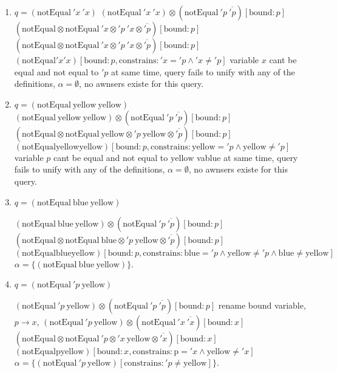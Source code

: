 \documentclass[11pt,a4paper]{report}
\newcommand{\var}[1]{'#1}
\newcommand{\unify}{\otimes}
\begin{document}
\begin{enumerate}
\item $q = (\text{notEqual}\ \var{x}\ \var{x})$
\subitem $(\text{notEqual}\ \var{x}\ \var{x}) \unify (\text{notEqual}\ \var{p}\ \overline{\var{p}})[\text{bound}: p]$
\subitem $(\text{notEqual} \unify \text{notEqual}\ \var{x} \unify \var{p}\ \var{x} \unify \overline{\var{p}})[\text{bound}: p]$ 
\subitem $(\text{notEqual} \unify \text{notEqual}\ \var{x} \unify \var{p}\ \var{x} \unify \overline{\var{p}})[\text{bound}: p]$ 
\subitem $(\text{notEqual} \var{x} \var{x})[\text{bound}: p, \text{constrains}: \var{x}=\var{p} \wedge \var{x} \neq \var{p}]$
\subitem variable $x$ cant be equal and not equal to $\var{p}$ at same time,
\subitem query fails to unify with any of the definitions,
\subitem $\alpha=\emptyset$, no awnsers existe for this query.

\item $q = (\text{notEqual}\  \text{yellow}\ \text{yellow})$
\subitem $(\text{notEqual}\ \text{yellow}\ \text{yellow}) \unify (\text{notEqual}\ \var{p}\ \overline{\var{p}})[\text{bound}: p]$
\subitem $(\text{notEqual} \unify \text{notEqual}\ \text{yellow} \unify \var{p}\ \text{yellow} \unify \overline{\var{p}})[\text{bound}: p]$ 
\subitem $(\text{notEqual} \text{yellow} \text{yellow})[\text{bound}: p, \text{constrains}: \text{yellow}=\var{p} \wedge \text{yellow} \neq \var{p}]$
\subitem variable $p$ cant be equal and not equal to $\text{yellow}$ vablue at same time,
\subitem query fails to unify with any of the definitions,
\subitem $\alpha=\emptyset$, no awnsers existe for this query.

\item $q = (\text{notEqual}\  \text{blue}\ \text{yellow})$

\subitem $(\text{notEqual}\ \text{blue}\ \text{yellow}) \unify (\text{notEqual}\ \var{p}\ \overline{\var{p}})[\text{bound}: p]$
\subitem $(\text{notEqual} \unify \text{notEqual}\ \text{blue} \unify \var{p}\ \text{yellow} \unify \overline{\var{p}})[\text{bound}: p]$ 
\subitem $(\text{notEqual} \text{blue} \text{yellow})[\text{bound}: p, \text{constrains}: \text{blue}=\var{p} \wedge \text{yellow} \neq \var{p} \wedge \text{blue} \neq \text{yellow}]$
\subitem $\alpha=\{(\text{notEqual}\  \text{blue}\ \text{yellow})\}$.

\item $q = (\text{notEqual}\ \var{p}\ \text{yellow})$

\subitem $(\text{notEqual}\ \var{p}\ \text{yellow}) \unify (\text{notEqual}\ \var{p}\ \overline{\var{p}})[\text{bound}: p]$
\subitem rename bound variable, $p \rightarrow x$, 
\subitem $(\text{notEqual}\ \var{p}\ \text{yellow}) \unify (\text{notEqual}\ \var{x}\ \overline{\var{x}})[\text{bound}: x]$
\subitem $(\text{notEqual} \unify \text{notEqual}\ \var{p} \unify \var{x}\ \text{yellow} \unify \overline{\var{x}})[\text{bound}: x]$ 
\subitem $(\text{notEqual} \text{p} \text{yellow})[\text{bound}: x, \text{constrains}: \text{p}=\var{x} \wedge \text{yellow} \neq \var{x}]$
\subitem $\alpha=\{(\text{notEqual}\  \var{p}\ \text{yellow})[\text{constrains}: \var{p} \neq \text{yellow}]\}$.

\end{enumerate}
\end{document}
